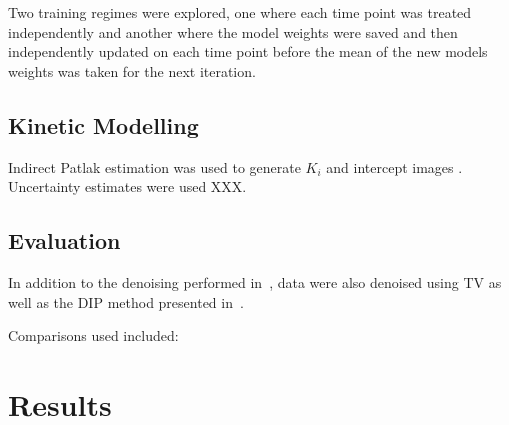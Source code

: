         Two training regimes were explored, one where each time point was treated independently and another where the model weights were saved and then independently updated on each time point before the mean of the new models weights was taken for the next iteration.
        
    
    \subsection{Kinetic Modelling} \label{sec:kinetic_modelling}
        Indirect Patlak estimation was used to generate $K_i$ and intercept images \cite{patlak1983GraphicalEvaluationBloodtoBrain}. Uncertainty estimates were used XXX.
        
    
    \subsection{Evaluation} \label{sec:evaluation}
        In addition to the denoising performed in~, data were also denoised using \gls{TV} as well as the \gls{DIP} method presented in~\cite{Gong2019PETPrior}.
        
        Comparisons used included: 


\section{Results} \label{sec:results}
        
        
        
        
        
        
    
